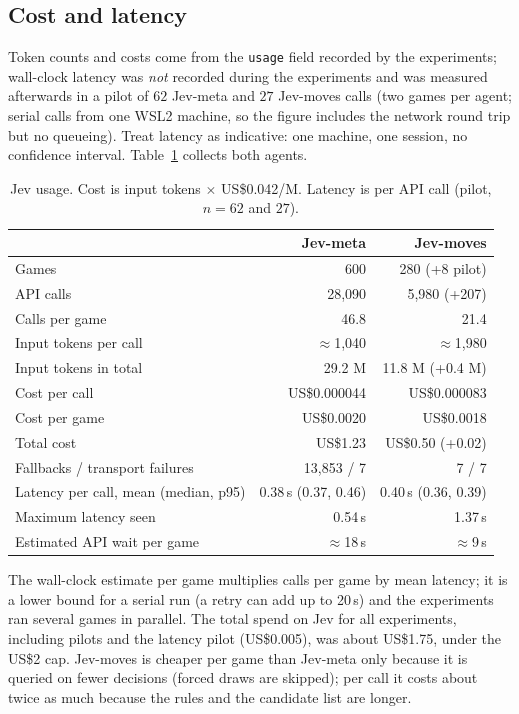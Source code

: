 \subsection{Cost and latency}
Token counts and costs come from the \texttt{usage} field recorded by the experiments; wall-clock latency was \emph{not} recorded during the experiments and was measured afterwards in a pilot of $62$ Jev-meta and $27$ Jev-moves calls (two games per agent; serial calls from one WSL2 machine, so the figure includes the network round trip but no queueing). Treat latency as indicative: one machine, one session, no confidence interval. Table~\ref{tab:jevcost} collects both agents.
\begin{table}[h]\centering\small
\caption{Jev usage. Cost is input tokens $\times$ US\$0.042/M. Latency is per API call (pilot, $n=62$ and $27$).}\label{tab:jevcost}
\begin{tabular}{@{}lrr@{}}\toprule
 & Jev-meta & Jev-moves\\\midrule
Games & 600 & 280 (+8 pilot)\\
API calls & 28{,}090 & 5{,}980 (+207)\\
Calls per game & 46.8 & 21.4\\
Input tokens per call & $\approx$1{,}040 & $\approx$1{,}980\\
Input tokens in total & 29.2 M & 11.8 M (+0.4 M)\\
Cost per call & US\$0.000044 & US\$0.000083\\
Cost per game & US\$0.0020 & US\$0.0018\\
Total cost & US\$1.23 & US\$0.50 (+0.02)\\
Fallbacks / transport failures & 13{,}853 / 7 & 7 / 7\\
Latency per call, mean (median, p95) & 0.38\,s (0.37, 0.46) & 0.40\,s (0.36, 0.39)\\
Maximum latency seen & 0.54\,s & 1.37\,s\\
Estimated API wait per game & $\approx$18\,s & $\approx$9\,s\\\bottomrule
\end{tabular}\end{table}
The wall-clock estimate per game multiplies calls per game by mean latency; it is a lower bound for a serial run (a retry can add up to 20\,s) and the experiments ran several games in parallel. The total spend on Jev for all experiments, including pilots and the latency pilot (US\$0.005), was about US\$1.75, under the US\$2 cap. Jev-moves is cheaper per game than Jev-meta only because it is queried on fewer decisions (forced draws are skipped); per call it costs about twice as much because the rules and the candidate list are longer.
